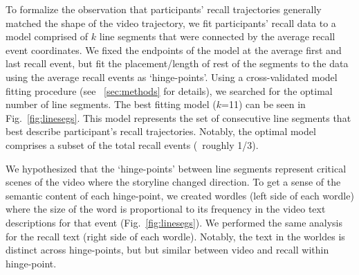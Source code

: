 \documentclass{article}
\begin{document}
{%

To formalize the observation that participants' recall trajectories generally matched the shape of the video trajectory, we fit participants' recall data to a model comprised of $k$ line segments that were connected by the average recall event coordinates. We fixed the endpoints of the model at the average first and last recall event, but fit the placement/length of rest of the segments to the data using the average recall events as `hinge-points'. Using a cross-validated model fitting procedure (see ~\ref{sec:methods} for details), we searched for the optimal number of line segments. The best fitting model ($k$=11) can be seen in Fig.~\ref{fig:linesegs}. This model represents the set of consecutive line segments that best describe participant's recall trajectories. Notably, the optimal model comprises a subset of the total recall events (~roughly 1/3).

We hypothesized that the `hinge-points' between line segments represent critical scenes of the video where the storyline changed direction. To get a sense of the semantic content of each hinge-point, we created wordles (left side of each wordle) where the size of the word is proportional to its frequency in the video text descriptions for that event (Fig.~\ref{fig:linesegs}). We performed the same analysis for the recall text (right side of each wordle).  Notably, the text in the worldes is distinct across hinge-points, but but similar between video and recall within hinge-point.


}
\end{document}

